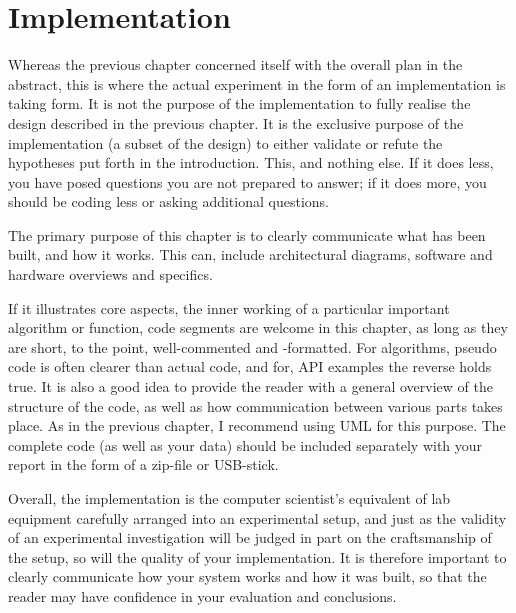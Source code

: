 \chapter{Implementation}
\label{cha:implementation}

Whereas the previous chapter concerned itself with the overall plan in
the abstract, this is where the actual experiment in the form of an
implementation is taking form.  It is not the purpose of the
implementation to fully realise the design described in the previous
chapter. It is the exclusive purpose of the implementation (a subset
of the design) to either validate or refute the hypotheses put forth
in the introduction. This, and nothing else. If it does less, you have
posed questions you are not prepared to answer; if it does more, you
should be coding less or asking additional questions.

The primary purpose of this chapter is to clearly communicate what has
been built, and how it works. This can, \eg include architectural
diagrams, software and hardware overviews and specifics.

If it illustrates core aspects, \eg the inner working of a particular
important algorithm or function, code segments are welcome in this
chapter, as long as they are short, to the point, well-commented and
-formatted.  For algorithms, pseudo code is often clearer than actual
code, and for, \eg \acs{API} examples the reverse holds true.  It is
also a good idea to provide the reader with a general overview of the
structure of the code, as well as how communication between various
parts takes place.  As in the previous chapter, I recommend using
\ac{UML} for this purpose.  The complete code (as well as your data)
should be included separately with your report in the form of a
zip-file or USB-stick.

Overall, the implementation is the computer scientist's equivalent of
lab equipment carefully arranged into an experimental setup, and just
as the validity of an experimental investigation will be judged in
part on the craftsmanship of the setup, so will the quality of your
implementation. It is therefore important to clearly communicate how
your system works and how it was built, so that the reader may have
confidence in your evaluation and conclusions.






